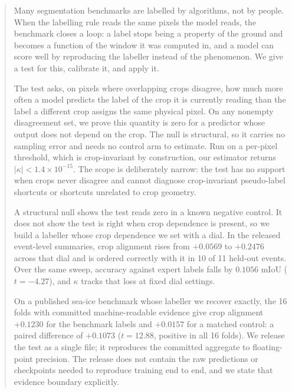 \begin{abstract}
Many segmentation benchmarks are labelled by algorithms, not by people. When the labelling rule reads the same pixels the model reads, the
benchmark closes a loop: a label stops being a property of the ground and becomes a
function of the window it was computed in, and a model can score well by reproducing
the labeller instead of the phenomenon. We give a test for this, calibrate it, and
apply it.

The test asks, on pixels where overlapping crops disagree, how much more often a
model predicts the label of the crop it is currently reading than the label a
different crop assigns the same physical pixel. On any nonempty disagreement set,
we prove this quantity is zero for a predictor whose output does not depend on the
crop. The null is structural, so it carries no sampling error and needs no control
arm to estimate. Run on a per-pixel threshold, which is crop-invariant by
construction, our estimator returns $|\kappa| < 1.4 \times 10^{-15}$. The scope is
deliberately narrow: the test has no support when crops never disagree and cannot
diagnose crop-invariant pseudo-label shortcuts or shortcuts unrelated to crop
geometry.

A structural null shows the test reads zero in a known negative control. It does not
show the test is right when crop dependence is present, so we build a labeller whose
crop dependence we set with a dial. In the released event-level summaries, crop
alignment rises from $+0.0569$ to $+0.2476$ across that dial and is ordered correctly
with it in 10 of 11 held-out events. Over the same sweep, accuracy against expert
labels falls by $0.1056$ mIoU ($t=-4.27$), and $\kappa$ tracks that loss at fixed dial
settings.

On a published sea-ice benchmark whose labeller we recover exactly, the 16 folds
with committed machine-readable evidence give crop alignment $+0.1230$ for the
benchmark labels and $+0.0157$ for a matched control: a paired difference of
$+0.1073$ ($t=12.88$, positive in all 16 folds). We release the test as a single
file; it reproduces the committed aggregate to floating-point precision. The
release does not contain the raw predictions or checkpoints needed to reproduce
training end to end, and we state that evidence boundary explicitly.
\end{abstract}
